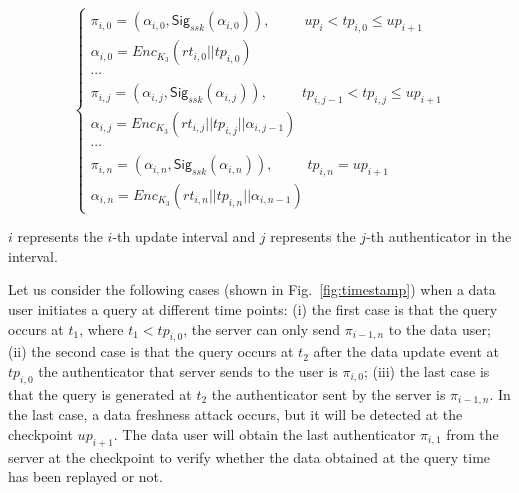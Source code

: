 \begin{equation}
    \left\{
    \begin{array}{ll} %
      \pi_{i, 0} = (\alpha_{i, 0}, \mathsf{Sig}_{ssk}(\alpha_{i, 0})),~~~~~~~~~~~up_i < tp_{i, 0} \leq up_{i+1} \\
      \alpha_{i, 0} = Enc_{K_3}(rt_{i, 0}||tp_{i, 0}) \\
      \cdots \\

     \pi_{i, j} = (\alpha_{i, j}, \mathsf{Sig}_{ssk}(\alpha_{i, j})),~~~~~~~~~~~tp_{i, j-1} < tp_{i, j} \leq up_{i+1}  \\
     \alpha_{i, j} = Enc_{K_3}(rt_{i, j}||tp_{i, j}||\alpha_{i, j-1}) \\
      \cdots  \\
     \pi_{i, n} = (\alpha_{i, n}, \mathsf{Sig}_{ssk}(\alpha_{i, n})),~~~~~~~~~~~tp_{i, n}=up_{i+1} \\
     \alpha_{i, n} = Enc_{K_3}(rt_{i, n}||tp_{i, n}||\alpha_{i, n-1})
    \end{array}
    \right.
  \end{equation}

\noindent {} $i$ represents the $i$-th update interval and $j$ represents the $j$-th authenticator in the interval.

Let us consider the following cases (shown in Fig.~\ref{fig:timestamp}) when a data user initiates a query at different time points: (i) the first case is that the query occurs at $t_1$, where $t_1 < tp_{i, 0}$, the server can only send $\pi_{i-1, n}$ to the data user; (ii) the second case is that the query occurs at $t_2$ after the data update event at $tp_{i, 0}$ the authenticator that server sends to the user is $\pi_{i, 0}$; (iii) the last case is that the query is generated at $t_2$ the authenticator sent by the server is $\pi_{i-1, n}$. In the last case, a data freshness attack occurs, but it will be detected at the checkpoint $up_{i+1}$. The data user will obtain the last authenticator $\pi_{i, 1}$ from the server at the checkpoint to verify whether the data obtained at the query time has been replayed or not.

